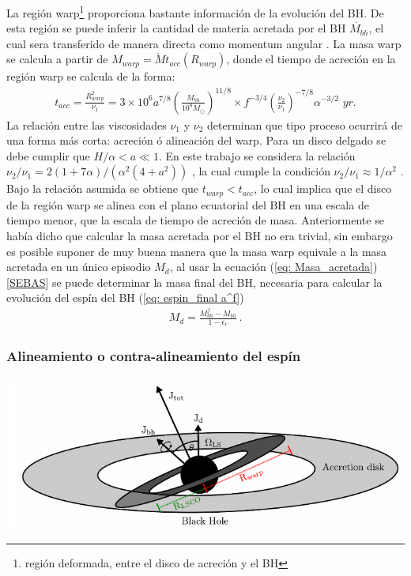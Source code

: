 La región warp\footnote{región deformada, entre el disco de acreción y el BH} proporciona bastante información de la evolución del BH. De esta región se puede inferir la cantidad de materia acretada por el BH $\dot{M_{bh}}$, el cual sera transferido de manera directa como momentum angular \cite{volonteri2007}. La masa warp se calcula a partir de $M_{warp}=\dot{M}t_{acc}(R_{warp})$, donde el tiempo de acreción en la región warp se calcula de la forma:
%
\begin{align}
 t_{acc}=\frac{R^{2}_{warp}}{\nu_{1}} = 3 \times10^{6}a^{7/8} \left(\frac{M_{bh}}{10^{8}M_{\odot}} \right)^{11/8}\times f^{-3/4}\left( \frac{\nu_{2}}{\nu_{1}}\right)^{-7/8}\alpha^{-3/2}\,\, \textit{yr}.
\end{align}
%
La relación entre las viscosidades $\nu_1$ y $\nu_2$ determinan que tipo proceso ocurrirá de una forma más corta: acreción ó alineación del warp. Para un disco delgado se debe cumplir que $H/\alpha < a \ll 1$. En este trabajo se considera la relación $\nu_{2}/\nu_{1}=2(1+7\alpha)/(\alpha^{2}(4+a^{2}))$ \cite{ogilvie1999} , la cual cumple la condición $\nu_{2}/\nu_{1}\approx 1/\alpha^{2}$ \cite{papaloizou1983}. Bajo la relación asumida se obtiene que $t_{warp}< t_{acc}$, lo cual implica que el disco de la región warp
se alinea con el plano ecuatorial del BH en una escala de tiempo menor, que la escala de tiempo de acreción de masa. Anteriormente se había 
dicho que calcular la masa acretada por el BH no era trivial, sin embargo es posible suponer de muy buena manera que la masa warp equivale a la masa acretada en un único episodio $M_{d}$, al usar la ecuación (\ref{eq: Masa_acretada}) [{\underline{SEBAS}}] se puede determinar la masa final del BH, necesaria para calcular la evolución del espín del BH (\ref{eq: espin_final a^f})
%
\begin{align}
 M_{d}= \frac{M_{bh}^{f}-M_{bh}}{1-\epsilon_{r}}\,.
 \label{eq: Masa_acretada}
\end{align}
%
    \subsubsection{Alineamiento o contra-alineamiento del espín}
    \label{subsubsec: Aling_Spin}
\begin{center}
\includegraphics[scale=.4]{./figures/4_Modelo_Spin/Sistema_con_region_warp.png}
\label{fig: sistema con zona warp}
\end{center}

